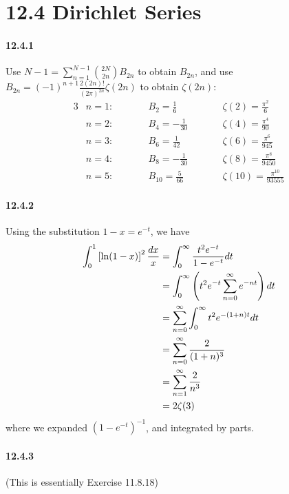 \documentclass[a4paper]{article}
\begin{document}
\section*{12.4 Dirichlet Series}

\paragraph{12.4.1}
Use $N-1=\sum_{n=1}^{N-1}\binom{2N}{2n}B_{2n}$ to obtain $B_{2n}$, and use $B_{2n}=(-1)^{n+1}\frac{2(2n)!}{(2\pi)^{2n}}\zeta(2n)$ to obtain $\zeta(2n)$:
\begin{alignat*}{3}
    & n=1: \qquad && B_{2}=\frac{1}{6}\qquad && \zeta(2)=\frac{\pi^2}{6}\\
    & n=2: \qquad && B_4=-\frac{1}{30}\qquad && \zeta(4)=\frac{\pi^4}{90}\\
    & n=3: \qquad && B_6=\frac{1}{42}\qquad && \zeta(6)=\frac{\pi^6}{945}\\
    & n=4: \qquad && B_8=-\frac{1}{30}\qquad && \zeta(8)=\frac{\pi^8}{9450}\\
    & n=5: \qquad && B_{10}=\frac{5}{66}\qquad && \zeta(10)=\frac{\pi^{10}}{93555}
\end{alignat*}

\paragraph{12.4.2}
Using the substitution $1-x=e^{-t}$, we have
\begin{equation*}
\begin{split}
    \int_0^1\left[\ln(1-x)\right]^2\frac{dx}{x} & =\int_0^\infty\frac{t^2e^{-t}}{1-e^{-t}}dt\\
    & =\int_0^\infty\left(t^2e^{-t}\sum_{n=0}^\infty e^{-nt} \right)dt\\
    & =\sum_{n=0}^\infty\int_0^\infty t^2e^{-(1+n)t}dt\\
    & =\sum_{n=0}^\infty\frac{2}{(1+n)^3}\\
    & =\sum_{n=1}^\infty\frac{2}{n^3}\\
    & =2\zeta(3)
\end{split}
\end{equation*}
where we expanded $(1-e^{-t})^{-1}$, and integrated by parts.

\paragraph{12.4.3}
(This is essentially Exercise 11.8.18)
\medskip
\end{document}
